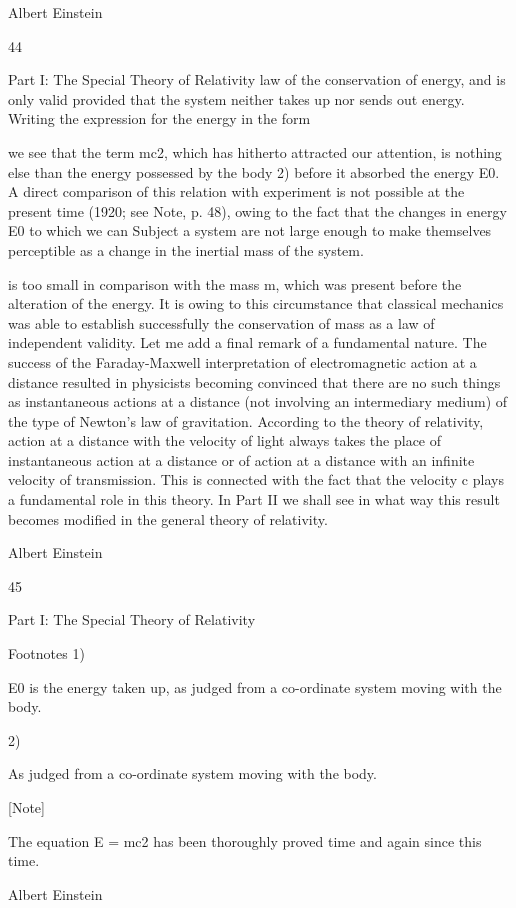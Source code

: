 \documentclass{article}
\begin{document}
Albert Einstein

44

Part I: The Special Theory of Relativity
law of the conservation of energy, and is only valid provided that the system neither takes
up nor sends out energy. Writing the expression for the energy in the form

we see that the term mc2, which has hitherto attracted our attention, is nothing else than
the energy possessed by the body 2) before it absorbed the energy E0.
A direct comparison of this relation with experiment is not possible at the present time
(1920; see Note, p. 48), owing to the fact that the changes in energy E0 to which we can
Subject a system are not large enough to make themselves perceptible as a change in the
inertial mass of the system.

is too small in comparison with the mass m, which was present before the alteration of the
energy. It is owing to this circumstance that classical mechanics was able to establish
successfully the conservation of mass as a law of independent validity.
Let me add a final remark of a fundamental nature. The success of the Faraday-Maxwell
interpretation of electromagnetic action at a distance resulted in physicists becoming
convinced that there are no such things as instantaneous actions at a distance (not involving
an intermediary medium) of the type of Newton's law of gravitation. According to the
theory of relativity, action at a distance with the velocity of light always takes the place of
instantaneous action at a distance or of action at a distance with an infinite velocity of
transmission. This is connected with the fact that the velocity c plays a fundamental role in
this theory. In Part II we shall see in what way this result becomes modified in the general
theory of relativity.

Albert Einstein

45

Part I: The Special Theory of Relativity

Footnotes
1)

E0 is the energy taken up, as judged from a co-ordinate system moving with the body.

2)

As judged from a co-ordinate system moving with the body.

[Note]

The equation E = mc2 has been thoroughly proved time and again since this time.

Albert Einstein
\end{document}
